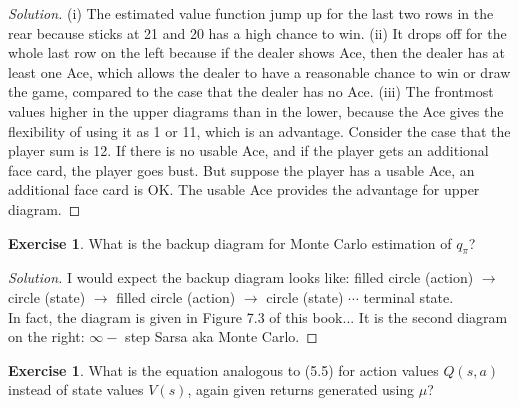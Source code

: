\documentclass[oneside,11pt]{article}
\theoremstyle{definition}
\newtheorem{exer}[thm]{Exercise}
\newenvironment{solution}
{\renewcommand\qedsymbol{$\blacksquare$}\begin{proof}[Solution]} {\end{proof}}
\begin{document}
\begin{shaded}
\begin{solution} 
(i) The estimated value function jump up for the last two rows in the rear because sticks at 21 and 20 has a high chance to win. (ii) It drops off for the whole last row on the left because if the dealer shows Ace, then the dealer has at least one Ace, which allows the dealer to have a reasonable chance to win or draw the game, compared to the case that the dealer has no Ace. (iii) The frontmost values higher in the upper diagrams than in the lower, because the Ace gives the flexibility of using it as 1 or 11, which is an advantage. Consider the case that the player sum is 12. If there is no usable Ace, and if the player gets an additional face card, the player goes bust. But suppose the player has a usable Ace, an additional face card is OK. The usable Ace provides the advantage for upper diagram.
\end{solution} 
\end{shaded}




\begin{exer}
What is the backup diagram for Monte Carlo estimation of $q_{\pi}$?
\end{exer}

\begin{shaded}
\begin{solution} 
I would expect the backup diagram looks like: filled circle (action) $\to$ circle (state)  $\to$  filled circle (action) $\to$ circle (state) $\cdots$ terminal state. \\

In fact, the diagram is given in Figure 7.3 of this book... It is the second diagram on the right: $\infty-$ step Sarsa aka Monte Carlo.

\end{solution} 
\end{shaded}






\begin{exer}
What is the equation analogous to (5.5) for action values $Q(s,a)$ instead of state values $V(s)$, again given returns generated using $\mu$?
\end{exer}
\end{document}

